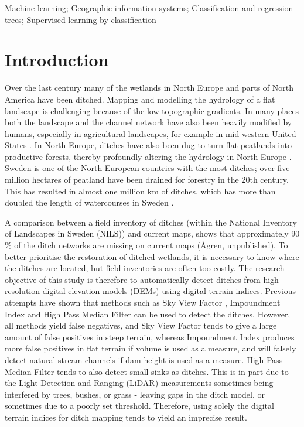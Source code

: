 \documentclass[]{interact}
\theoremstyle{plain}%
\theoremstyle{definition}
\theoremstyle{remark}
\begin{document}
\begin{keywords}
Machine learning; Geographic information systems; Classification and regression trees; Supervised learning by classification
\end{keywords}


\section{Introduction} \label{introduction}

Over the last century many of the wetlands in North Europe and parts of North America have been ditched. Mapping and modelling the hydrology of a flat landscape is challenging because of the low topographic gradients. In many places both the landscape and the channel network have also been heavily modified by humans, especially in agricultural landscapes, for example in mid-western United States \citep{passalacqua}. In North Europe, ditches have also been dug to turn flat peatlands into productive forests, thereby profoundly altering the hydrology in North Europe \citep{peatlands}. Sweden is one of the North European countries with the most ditches; over five million hectares of peatland have been drained for forestry in the 20th century. This has resulted in almost one million km of ditches, which has more than doubled the length of watercourses in Sweden \citep{hasselquist}.

A comparison between a field inventory of ditches (within the National Inventory of Landscapes in Sweden (NILS)) and current maps, shows that approximately 90 \% of the ditch networks are missing on current maps ({\AA}gren, unpublished). To better prioritise the restoration of ditched wetlands, it is necessary to know where the ditches are located, but field inventories are often too costly. The research objective of this study is therefore to automatically detect ditches from high-resolution digital elevation models (DEMs) using digital terrain indices. Previous attempts \citep{uppsala} have shown that methods such as Sky View Factor \citep{zaksek}, Impoundment Index \citep{whiteboxtools} and High Pass Median Filter \citep{whiteboxtools} can be used to detect the ditches. However, all methods yield false negatives, and Sky View Factor tends to give a large amount of false positives in steep terrain, whereas Impoundment Index produces more false positives in flat terrain if volume is used as a measure, and will falsely detect natural stream channels if dam height is used as a measure. High Pass Median Filter tends to also detect small sinks as ditches. This is in part due to the Light Detection and Ranging (LiDAR) measurements sometimes being interfered by trees, bushes, or grass - leaving gaps in the ditch model, or sometimes due to a poorly set threshold. Therefore, using solely the digital terrain indices for ditch mapping tends to yield an imprecise result.
\end{document}
